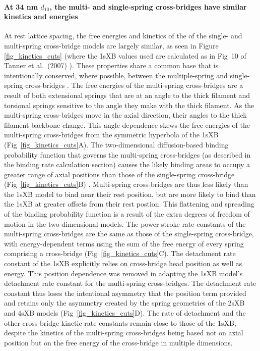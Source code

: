 \documentclass[10pt]{article}
\newcommand{\citep}[1]{\cite{#1}} %
\begin{document}
\paragraph{At 34 nm $d_{10}$, the multi- and single-spring cross-bridges have similar kinetics and energies} %
At rest lattice spacing, the free energies and kinetics of the of the single- and multi-spring cross-bridge models are largely similar, as seen in Figure \ref{fig_kinetics_cuts} (where the 1sXB values used are calculated as in Fig~10 of Tanner et al.~(2007) \citep{Tanner2007}).  
These properties share a common base that is intentionally conserved, where possible, between the multiple-spring and single-spring cross-bridges \citep{Pate1989}.
The free energies of the multi-spring cross-bridges are a result of both extensional springs that are at an angle to the thick filament and torsional springs sensitive to the angle they make with the thick filament. 
As the multi-spring cross-bridges move in the axial direction, their angles to the thick filament backbone change. 
This angle dependence skews the free energies of the multi-spring cross-bridges from the symmetric hyperbola of the 1sXB (Fig~\ref{fig_kinetics_cuts}A).
The two-dimensional diffusion-based binding probability function that governs the multi-spring cross-bridges (as described in the binding rate calculation section) causes the likely binding areas to occupy a greater range of axial positions than those of the single-spring cross-bridge (Fig~\ref{fig_kinetics_cuts}B) \citep{BergBook, DillBook}.
Multi-spring cross-bridges are thus less likely than the 1sXB model to bind near their rest position, but are more likely to bind than the 1sXB at greater offsets from their rest postion. 
This flattening and spreading of the binding probability function is a result of the extra degrees of freedom of motion in the two-dimensional models. 
The power stroke rate constants of the multi-spring cross-bridges are the same as those of the single-spring cross-bridge, with energy-dependent terms using the sum of the free energy of every spring comprising a cross-bridge (Fig~\ref{fig_kinetics_cuts}C). 
The detachment rate constant of the 1sXB explicitly relies on cross-bridge head position as well as energy.
This position dependence was removed in adapting the 1sXB model's detachment rate constant for the multi-spring cross-bridges. 
The detachment rate constant thus loses the intentional asymmetry that the position term provided and retains only the asymmetry created by the spring geometries of the 2sXB and 4sXB models (Fig~\ref{fig_kinetics_cuts}D). 
The rate of detachment and the other cross-bridge kinetic rate constants remain close to those of the 1sXB, despite the kinetics of the multi-spring cross-bridges being based not on axial position but on the free energy of the cross-bridge in multiple dimensions. 
\end{document}

